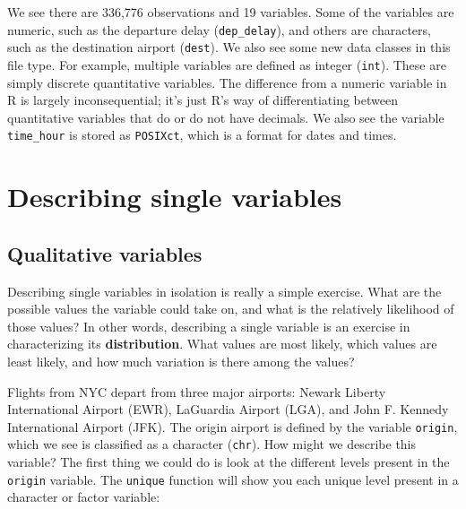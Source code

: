 \documentclass[
]{book}
\newenvironment{Shaded}{\begin{snugshade}}{\end{snugshade}}
\newcommand{\DecValTok}[1]{\textcolor[rgb]{0.00,0.00,0.81}{#1}}
\newcommand{\NormalTok}[1]{#1}
\newcommand{\SpecialCharTok}[1]{\textcolor[rgb]{0.81,0.36,0.00}{\textbf{#1}}}
\newcommand{\StringTok}[1]{\textcolor[rgb]{0.31,0.60,0.02}{#1}}
\begin{document}
\begin{Shaded}
\end{Shaded}

We see there are 336,776 observations and 19 variables. Some of the variables are numeric, such as the departure delay (\texttt{dep\_delay}), and others are characters, such as the destination airport (\texttt{dest}). We also see some new data classes in this file type. For example, multiple variables are defined as integer (\texttt{int}). These are simply discrete quantitative variables. The difference from a numeric variable in R is largely inconsequential; it's just R's way of differentiating between quantitative variables that do or do not have decimals. We also see the variable \texttt{time\_hour} is stored as \texttt{POSIXct}, which is a format for dates and times.

\section{Describing single variables}\label{describing-single-variables}

\subsection{Qualitative variables}\label{qualitative-variables}

Describing single variables in isolation is really a simple exercise. What are the possible values the variable could take on, and what is the relatively likelihood of those values? In other words, describing a single variable is an exercise in characterizing its \textbf{distribution}. What values are most likely, which values are least likely, and how much variation is there among the values?

Flights from NYC depart from three major airports: Newark Liberty International Airport (EWR), LaGuardia Airport (LGA), and John F. Kennedy International Airport (JFK). The origin airport is defined by the variable \texttt{origin}, which we see is classified as a character (\texttt{chr}). How might we describe this variable? The first thing we could do is look at the different levels present in the \texttt{origin} variable. The \texttt{unique} function will show you each unique level present in a character or factor variable:
\end{document}
